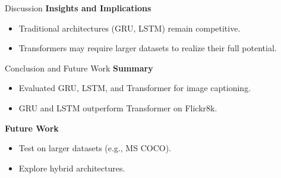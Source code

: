 \documentclass[10pt]{beamer}
\theoremstyle{remark}
\begin{document}
\begin{frame}{Discussion}
	\textbf{Insights and Implications}
	\begin{itemize}
			\item Traditional architectures (GRU, LSTM) remain competitive.
			\item Transformers may require larger datasets to realize their full potential.
	\end{itemize}
\end{frame}

\begin{frame}{Conclusion and Future Work}
	\textbf{Summary}
	\begin{itemize}
			\item Evaluated GRU, LSTM, and Transformer for image captioning.
			\item GRU and LSTM outperform Transformer on Flickr8k.
	\end{itemize}
	\textbf{Future Work}
	\begin{itemize}
			\item Test on larger datasets (e.g., MS COCO).
			\item Explore hybrid architectures.
	\end{itemize}
\end{frame}
\end{document}
